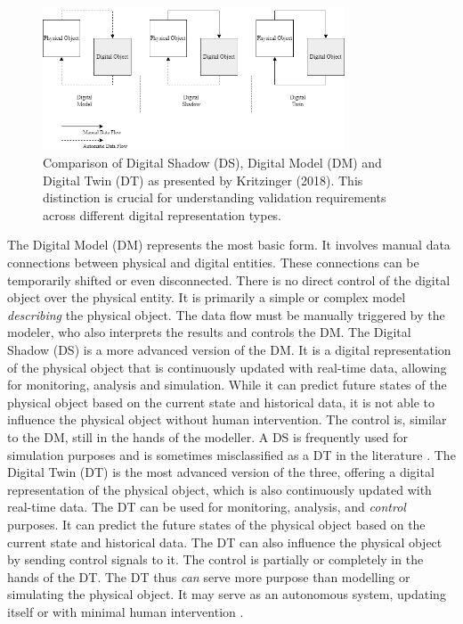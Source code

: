 \begin{figure}[htbp]
  \centering
  \includegraphics[width=0.8\textwidth]{figures/kritzinger.png}
  \caption{Comparison of Digital Shadow (DS), Digital Model (DM) and Digital Twin (DT) as presented by Kritzinger (2018). This distinction is crucial for understanding validation requirements across different digital representation types.}
  \label{fig:Kritzinger}
\end{figure}

The Digital Model (DM) represents the most basic form. It involves manual data connections between physical and digital entities. These connections can be temporarily shifted or even disconnected. There is no direct control of the digital object over the physical entity. It is primarily a simple or complex model \textit{describing} the physical object. The data flow must be manually triggered by the modeler, who also interprets the results and controls the DM.
The Digital Shadow (DS) is a more advanced version of the DM. It is a digital representation of the physical object that is continuously updated with real-time data, allowing for monitoring, analysis and simulation. While it can predict future states of the physical object based on the current state and historical data, it is not able to influence the physical object without human intervention. The control is, similar to the DM, still in the hands of the modeller. A DS is frequently used for simulation purposes and is sometimes misclassified as a DT in the literature \parencite{kritzinger2018digital,sepasgozar2021differentiating}.
The Digital Twin (DT) is the most advanced version of the three, offering a digital representation of the physical object, which is also continuously updated with real-time data. The DT can be used for monitoring, analysis, and \textit{control} purposes. It can predict the future states of the physical object based on the current state and historical data. The DT can also influence the physical object by sending control signals to it. The control is partially or completely in the hands of the DT. The DT thus \textit{can} serve more purpose than modelling or simulating the physical object. It may serve as an autonomous system, updating itself or with minimal human intervention \parencite{kritzinger2018digital}.

